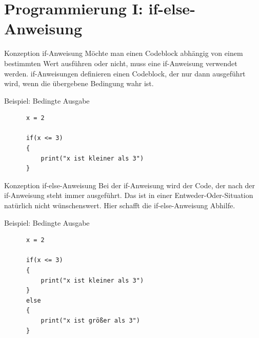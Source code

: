 \documentclass[xcolor=dvipsnames, aspectratio = 169]{beamer}
\begin{document}
\section{Programmierung I: if-else-Anweisung}

\begin{frame}[fragile]{Konzeption if-Anweisung}
    Möchte man einen Codeblock abhängig von einem bestimmten Wert ausführen oder nicht, muss eine if-Anweisung verwendet werden. if-Anweisungen definieren einen Codeblock, der nur dann ausgeführt wird, wenn die übergebene Bedingung wahr ist.\bigskip\\
\end{frame}

\begin{frame}[fragile]{Beispiel: Bedingte Ausgabe}
  \begin{verbatim}
      x = 2
      
      if(x <= 3)
      {
          print("x ist kleiner als 3")
      }
  \end{verbatim}
\end{frame}

\begin{frame}[fragile]{Konzeption if-else-Anweisung}
    Bei der if-Anweisung wird der Code, der nach der if-Anweisung steht immer ausgeführt. Das ist in einer Entweder-Oder-Situation natürlich nicht wünschenswert. Hier schafft die if-else-Anweisung Abhilfe.\bigskip\\
\end{frame}

\begin{frame}[fragile]{Beispiel: Bedingte Ausgabe}
    \begin{verbatim}
      x = 2
      
      if(x <= 3)
      {
          print("x ist kleiner als 3")
      }
      else
      {
          print("x ist größer als 3")
      }
    \end{verbatim}
\end{frame}
\end{document}
